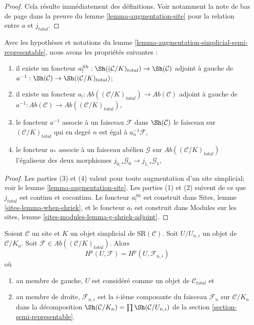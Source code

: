 \begin{proof}
Cela résulte immédiatement des définitions.
Voir notamment la note de bas de page dans la preuve du lemme
\ref{lemma-augmentation-site}
pour la relation entre $a$ et $j_{total}$.
\end{proof}

\begin{lemma}
\label{lemma-comparison}
Avec les hypothèses et notations du
lemme \ref{lemma-augmentation-simplicial-semi-representable},
nous avons les propriétés suivantes :
\begin{enumerate}
\item il existe un foncteur
$a^{Sh}_! : \Sh((\mathcal{C}/K)_{total}) \to \Sh(\mathcal{C})$
adjoint à gauche de $a^{-1} : \Sh(\mathcal{C}) \to \Sh((\mathcal{C}/K)_{total})$;
\item il existe un foncteur
$a_! : \textit{Ab}((\mathcal{C}/K)_{total}) \to \textit{Ab}(\mathcal{C})$
adjoint à gauche de
$a^{-1} : \textit{Ab}(\mathcal{C}) \to \textit{Ab}((\mathcal{C}/K)_{total})$,
\item le foncteur $a^{-1}$ associe à un faisceau
$\mathcal{F}$ dans $\Sh(\mathcal{C})$ le faisceau sur $(\mathcal{C}/K)_{total}$
qui en degré $n$ est égal à $a_n^{-1}\mathcal{F}$,
\item le foncteur $a_*$ associe à un faisceau abélien $\mathcal{G}$ sur
$\textit{Ab}((\mathcal{C}/K)_{total})$ l'égaliseur des deux morphismes
$j_{0, *}\mathcal{G}_0 \to j_{1, *}\mathcal{G}_1$,
\end{enumerate}
\end{lemma}

\begin{proof}
Les parties (3) et (4) valent pour toute augmentation d'un
site simplicial; voir le lemme \ref{lemma-augmentation-site}.
Les parties (1) et (2) suivent de ce que $j_{total}$ est continu et cocontinu.
Le foncteur $a^{Sh}_!$ est construit dans
Sites, lemme \ref{sites-lemma-when-shriek},
et le foncteur $a_!$ est construit dans Modules
sur les sites, lemme
\ref{sites-modules-lemma-g-shriek-adjoint}.
\end{proof}

\begin{lemma}
\label{lemma-sanity-check-simplicial-semi-representable}
Soient $\mathcal{C}$ un site et $K$ un objet simplicial de
$\text{SR}(\mathcal{C})$. Soit $U/U_{n, i}$ un objet de
$\mathcal{C}/K_n$. Soit
$\mathcal{F} \in \textit{Ab}((\mathcal{C}/K)_{total})$.
Alors
$$
H^p(U, \mathcal{F}) = H^p(U, \mathcal{F}_{n, i})
$$
où
\begin{enumerate}
\item au membre de gauche, $U$ est considéré comme un objet de
$\mathcal{C}_{total}$ et
\item au membre de droite, $\mathcal{F}_{n, i}$ est la $i$-ième composante
du faisceau $\mathcal{F}_n$ sur $\mathcal{C}/K_n$
dans la décomposition $\Sh(\mathcal{C}/K_n) = \prod \Sh(\mathcal{C}/U_{n, i})$
de la section \ref{section-semi-representable}.
\end{enumerate}
\end{lemma}

